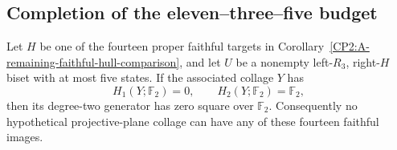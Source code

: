 \subsection{Completion of the eleven--three--five budget}

\begin{lemma}
\label{CP2:A-eleven-proper-remaining-hulls-complete}
Let $H$ be one of the fourteen proper faithful targets in
Corollary~\ref{CP2:A-remaining-faithful-hull-comparison}, and let
$U$ be a nonempty left-$R_3$, right-$H$ biset with at most five
states.  If the associated collage $Y$ has
\[
 H_1(Y;\mathbb F_2)=0,\qquad H_2(Y;\mathbb F_2)=\mathbb F_2,
\]
then its degree-two generator has zero square over $\mathbb F_2$.
Consequently no hypothetical projective-plane collage can have
any of these fourteen faithful images.
\end{lemma}
